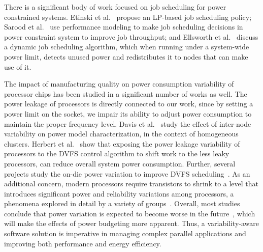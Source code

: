 There is a significant body of work focused on job scheduling for power constrained systems.
Etinski et al.~\cite{5999809} propose an LP-based job scheduling policy; %
Sarood et al.~\cite{Sarood:2014:MTO:2683593.2683682} use performance modeling 
to make job scheduling decisions in power constraint system to improve job throughput;
and  Ellsworth et al.~\cite{Ellsworth:2015:PSD:2749246.2749277} discuss a dynamic job scheduling algorithm, which when running under a system-wide power limit, detects unused power and redistributes it to nodes that can make use of it.
%

The impact of manufacturing quality on power consumption variability of processor chips has been studied in a significant number of works as well.
The power leakage of processors is directly connected to our work, since by setting a power limit on the socket, we impair its ability to adjust power consumption
to maintain the proper frequency level.
Davis et al.~\cite{61401478} study the effect of inter-node variability on power model characterization, in the context of homogeneous clusters.
Herbert et al.~\cite{Herbert:2012:EPV:2490159.2490164} show that exposing the power leakage variability of processors to the DVFS control algorithm to shift work to the less leaky processors, can reduce overall system power consumption.
Further, several projects study %
the on-die power variation to improve DVFS scheduling~\cite{4919634,4798265,Teodorescu:2008:VAS:1381306.1382152}.
As an additional concern, modern processors require transistors to shrink to a level that introduces significant power and reliability variations among processors, a phenomena explored in detail by a variety of groups~\cite{Borkar:2003:PVI:775832.775920, 915379, 1046081}.
Overall, most studies conclude that power variation is expected to become worse in the future~\cite{1382598,915379}, which will make the effects of power budgeting more apparent.  Thus, a 
variability-aware software solution is imperative in managing complex parallel applications and 
improving both performance and energy efficiency. 


